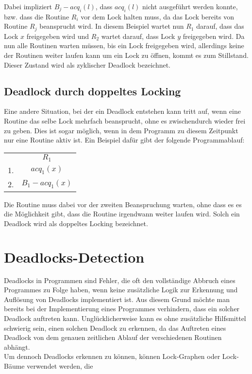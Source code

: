 Dabei impliziert $B_j-acq_i(l)$, dass $acq_{i}(l)$ nicht ausgeführt werden konnte,
bzw. dass die Routine $R_i$ vor dem Lock halten muss, da das Lock bereits von 
Routine $R_j$ beansprucht wird. In diesem Beispiel wartet nun $R_1$ 
darauf, dass das Lock $x$ freigegeben wird und $R_2$ wartet darauf, dass Lock 
$y$ freigegeben wird. Da nun alle Routinen warten müssen, bis ein Lock freigegeben 
wird, allerdings keine der Routinen weiter laufen kann um ein Lock zu öffnen, 
kommt es zum Stillstand. Dieser Zustand wird als zyklischer Deadlock bezeichnet.
\subsection{Deadlock durch doppeltes Locking}\label{Kap::Theo:DoubleLocking}
Eine andere Situation, bei der ein Deadlock entstehen kann tritt auf, wenn 
eine Routine das selbe Lock mehrfach beansprucht, ohne es zwischendurch wieder 
frei zu geben. Dies ist sogar möglich, wenn in dem Programm zu diesem Zeitpunkt
nur eine Routine aktiv ist. Ein Beispiel dafür gibt der folgende Programmablauf:
\begin{table}[H]
    \centering
    \begin{tabular}{cc}
        & $R_1$ \\
        1. & $acq_{1}(x)$ \\
        2. & $B_1-acq_1(x)$
    \end{tabular}
\end{table}
Die Routine muss dabei vor der zweiten Beanspruchung warten,
ohne dass es es die Möglichkeit gibt, dass die Routine irgendwann weiter laufen wird.
Solch ein Deadlock wird als doppeltes Locking bezeichnet.\\
\section{Deadlocks-Detection}
Deadlocks in Programmen sind Fehler, die oft den vollständige Abbruch eines 
Programmes zu Folge haben, wenn keine zusätzliche Logik zur Erkennung und Auflösung von 
Deadlocks implementiert ist. Aus diesem Grund möchte man bereits bei der 
Implementierung eines Programmes verhindern, dass ein solcher Deadlock auftreten 
kann. Unglücklicherweise kann es ohne zusätzliche Hilfsmittel schwierig sein, 
einen solchen Deadlock zu erkennen, da das Auftreten eines Deadlock von dem 
genauen zeitlichen Ablauf der verschiedenen Routinen abhängt.\\
Um dennoch Deadlocks 
erkennen zu können, können Lock-Graphen oder Lock-Bäume verwendet werden, die 
